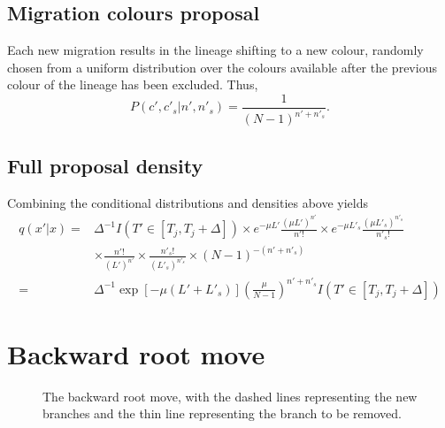 \documentclass[a4paper,11pt]{article}
\begin{document}
\subsection{Migration colours proposal}

Each new migration results in the lineage shifting to a new colour,
randomly chosen from a uniform distribution over the colours available
after the previous colour of the lineage has been excluded. Thus,
\begin{equation}
  P(c',c'_s|n',n'_s)=\frac{1}{(N-1)^{n'+n'_s}}.
\end{equation}

\subsection{Full proposal density}

Combining the conditional distributions and densities above yields
\begin{align}
  q(x'|x)=&\Delta^{-1}I(T'\in[T_j,T_j+\Delta])
  \times e^{-\mu L'}\frac{(\mu L')^{n'}}{n'!}
  \times e^{-\mu L'_s}\frac{(\mu L'_s)^{n'_s}}{n'_s!}\nonumber\\
  &\times \frac{n'!}{(L')^{n'}}
  \times \frac{n'_s!}{(L'_s)^{n'_s}}
  \times (N-1)^{-(n'+n'_s)}\nonumber\\
=&\Delta^{-1}\exp[-\mu(L'+L'_s)]\left(\frac{\mu}{N-1}\right)^{n'+n'_s}
I(T'\in[T_j,T_j+\Delta])
\end{align}

\section{Backward root move}

\begin{figure}
\begin{center}
\end{center}
\caption{The backward root move, with the dashed lines representing
the new branches and the thin line representing the branch to be
removed.}
\end{figure}
\end{document}
